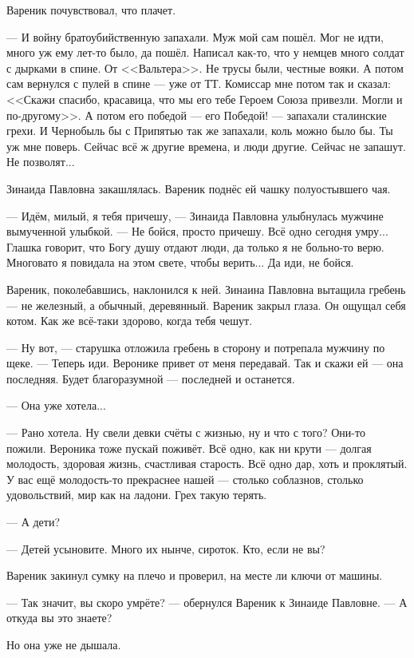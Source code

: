 \documentclass[a4paper,10pt,fleqn]{book}\usepackage{polyglossia}\setdefaultlanguage{english}\setotherlanguage{russian}\defaultfontfeatures{Ligatures=TeX,Mapping=tex-text} \usepackage{xcolor}\definecolor{lightgray}{HTML}{bbbbbb}\color{lightgray}\newcommand{\ml}[3]{\textcolor{black}{#3}}
\begin{document}
Вареник почувствовал, что плачет.

--- И войну братоубийственную запахали.
Муж мой сам пошёл.
Мог не идти, много уж ему лет-то было, да пошёл.
Написал как-то, что у немцев много солдат с дырками в спине.
От <<Вальтера>>.
Не трусы были, честные вояки.
А потом сам вернулся с пулей в спине --- уже от ТТ.
Комиссар мне потом так и сказал: <<Скажи спасибо, красавица, что мы его тебе Героем Союза привезли.
Могли и по-другому>>.
А потом его победой --- его Победой! --- запахали сталинские грехи.
И Чернобыль бы с Припятью так же запахали, коль можно было бы.
Ты уж мне поверь.
Сейчас всё ж другие времена, и люди другие.
Сейчас не запашут.
Не позволят...

Зинаида Павловна закашлялась.
Вареник поднёс ей чашку полуостывшего чая.

--- Идём, милый, я тебя причешу, --- Зинаида Павловна улыбнулась мужчине вымученной улыбкой.
--- Не бойся, просто причешу.
Всё одно сегодня умру...
Глашка говорит, что Богу душу отдают люди, да только я не больно-то верю.
Многовато я повидала на этом свете, чтобы верить...
Да иди, не бойся.

Вареник, поколебавшись, наклонился к ней.
Зинаина Павловна вытащила гребень --- не железный, а обычный, деревянный.
Вареник закрыл глаза.
Он ощущал себя котом.
Как же всё-таки здорово, когда тебя чешут.

--- Ну вот, --- старушка отложила гребень в сторону и потрепала мужчину по щеке.
--- Теперь иди.
Веронике привет от меня передавай.
Так и скажи ей --- она последняя.
Будет благоразумной --- последней и останется.

--- Она уже хотела...

--- Рано хотела.
Ну свели девки счёты с жизнью, ну и что с того?
Они-то пожили.
Вероника тоже пускай поживёт.
Всё одно, как ни крути --- долгая молодость, здоровая жизнь, счастливая старость.
Всё одно дар, хоть и проклятый.
У вас ещё молодость-то прекраснее нашей --- столько соблазнов, столько удовольствий, мир как на ладони.
Грех такую терять.

--- А дети?

--- Детей усыновите.
Много их нынче, сироток.
Кто, если не вы?

Вареник закинул сумку на плечо и проверил, на месте ли ключи от машины.

--- Так значит, вы скоро умрёте? --- обернулся Вареник к Зинаиде Павловне.
--- А откуда вы это знаете?

Но она уже не дышала.
\end{document}
